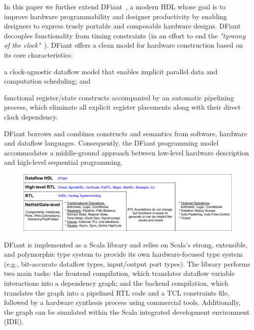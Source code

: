 In this paper we further extend DFiant~\cite{Port2017}, a modern HDL whose goal is to improve hardware programmability and designer productivity by enabling designers to express truely portable and composable hardware designs.
DFiant decouples functionality from timing constraints (in an effort to end the \emph{"tyranny of the clock"}~\cite{Sutherland2012}). DFiant offers a clean model for hardware construction based on its core characteristics:
\begin{enumerate*}[label=(\roman*)]
\item
  a clock-agnostic dataflow model that enables implicit parallel data and computation scheduling; and
\item
  functional register/state constructs accompanied by an automatic pipelining process, which eliminate all explicit register placements along with their direct clock dependency.
\end{enumerate*} DFiant borrows and combines constructs and semantics from software, hardware and dataflow languages. Consequently, the DFiant programming model accommodates a middle-ground approach between low-level hardware description and high-level sequential programming. 

\begin{figure}[t]
	\centering
	\captionsetup{justification=centering}
	\includegraphics[width=\linewidth]{graphics/motivation.pdf} 
	\label{fig:motivation}
\end{figure}

DFiant is implemented as a Scala library and relies on Scala's strong, extensible, and polymorphic type system to provide its own hardware-focused type system (e.g., bit-accurate dataflow types, input/output port types). The library performs two main tasks: the frontend compilation, which translates dataflow variable interactions into a dependency graph; and the backend compilation, which translates the graph into a pipelined RTL code and a TCL constraints file, followed by a hardware synthesis process using commercial tools. Additionally, the graph can be simulated within the Scala integrated development environment (IDE). 

